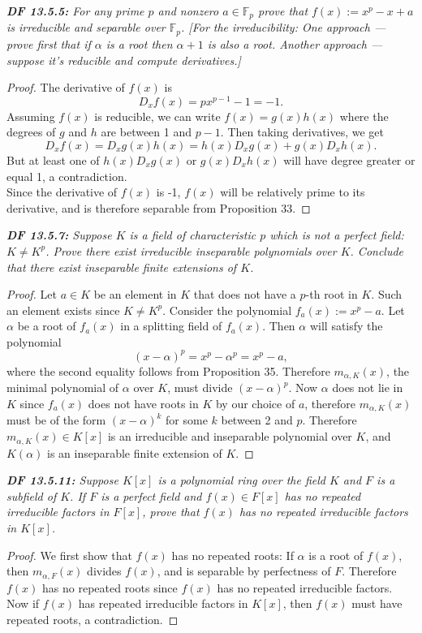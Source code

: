 \documentclass{article}
\begin{document}
\it \textbf{DF 13.5.5:} For any prime $p$ and nonzero $a\in\mathbb{F}_p$
  prove that $f(x):=x^p-x+a$ is irreducible and separable over $\mathbb{F}_p$.
  [For the irreducibility: One approach --- prove first that if $\alpha$ is
  a root then $\alpha+1$  is also a root. Another approach --- suppose it's
  reducible and compute derivatives.]

  \begin{proof}
    The derivative of $f(x)$ is
    \[D_x f(x) =px^{p-1}-1 =-1.\]
    Assuming $f(x)$ is reducible, we can write $f(x)=g(x)h(x)$ where the
    degrees of $g$ and $h$ are between 1 and $p-1$. Then taking
    derivatives, we get
    \[D_x f(x) =D_x g(x)h(x) =h(x)D_x g(x) +g(x)D_x h(x).\]
    But at least one of $h(x)D_x g(x)$ or $g(x)D_x h(x)$ will have degree
    greater or equal 1, a contradiction. \\

    Since the derivative of $f(x)$ is -1, $f(x)$ will be relatively prime
    to its derivative, and is therefore separable from Proposition 33.
  \end{proof}

\it \textbf{DF 13.5.7:} Suppose $K$ is a field of characteristic $p$ which
  is not a perfect field: $K\neq K^p$. Prove there exist irreducible
  inseparable polynomials over $K$. Conclude that there exist inseparable
  finite extensions of $K$.

  \begin{proof}
    Let $a\in K$ be an element in $K$ that does not have a $p$-th root in
    $K$. Such an element exists since $K\neq K^p$. Consider the polynomial
    $f_a(x):= x^p-a$. Let $\alpha$ be a root of $f_a(x)$ in a splitting field
    of $f_a(x)$. Then $\alpha$ will satisfy the polynomial
    \[(x-\alpha)^p=x^p-\alpha^p=x^p-a,\]
    where the second equality follows from Proposition 35. Therefore
    $m_{\alpha,K}(x)$, the minimal polynomial of $\alpha$ over $K$, must
    divide $(x-\alpha)^p$. Now $\alpha$ does not lie in $K$ since
    $f_a(x)$ does not have roots in $K$ by our choice of $a$, therefore
    $m_{\alpha,K}(x)$ must be of the form $(x-\alpha)^k$ for some $k$
    between 2 and $p$. Therefore $m_{\alpha,K}(x)\in K[x]$ is an
    irreducible and inseparable polynomial over $K$, and $K(\alpha)$ is an
    inseparable finite extension of $K$.
  \end{proof}

\it \textbf{DF 13.5.11:} Suppose $K[x]$ is a polynomial ring over the field
  $K$ and $F$ is a subfield of $K$. If $F$ is a perfect field and $f(x)\in
  F[x]$ has no repeated irreducible factors in $F[x]$, prove that $f(x)$
  has no repeated irreducible factors in $K[x]$.

  \begin{proof}
    We first show that $f(x)$ has no repeated roots: If $\alpha$ is a root
    of $f(x)$, then $m_{\alpha,F}(x)$ divides $f(x)$, and is separable by
    perfectness of $F$. Therefore $f(x)$ has no repeated roots since $f(x)$
    has no repeated irreducible factors. \\

    Now if $f(x)$ has repeated irreducible factors in $K[x]$, then $f(x)$
    must have repeated roots, a contradiction.
  \end{proof}
\end{document}
